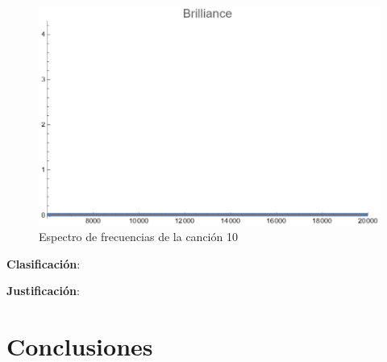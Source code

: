 \documentclass[12pt, letterpaper]{article}
\begin{document}
\begin{figure}[H]
\begin{minipage}{.3\textwidth}
  \end{minipage}
  \begin{minipage}{0.03\textwidth}\end{minipage}
  \begin{minipage}{.3\textwidth}
    \centering
    \includegraphics[width=.9\linewidth]{imgs/Cancion10/brilliance.png}
  \end{minipage}
  \caption{Espectro de frecuencias de la canción 10}
  \label{fig:esp010}
\end{figure}

\textbf{Clasificación}: 

\textbf{Justificación}: 

\newpage

\section{Conclusiones}
\end{document}
